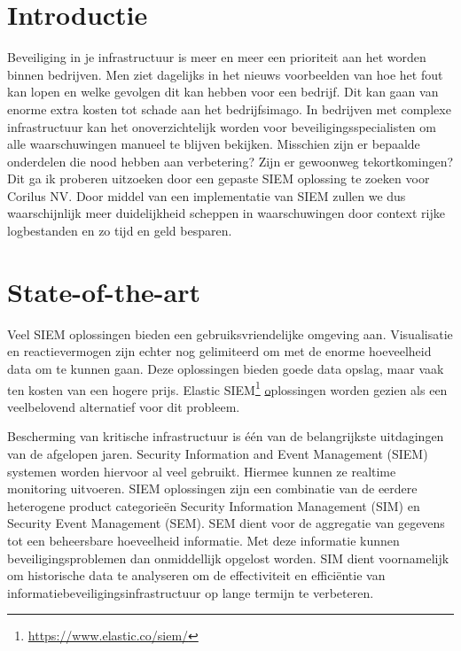 
\section{Introductie} %
\label{sec:introductie}

Beveiliging in je infrastructuur is meer en meer een prioriteit aan het worden binnen bedrijven. Men ziet dagelijks in het nieuws voorbeelden van hoe het fout kan lopen en welke gevolgen dit kan hebben voor een bedrijf. Dit kan gaan van enorme extra kosten tot schade aan het bedrijfsimago. In bedrijven met complexe infrastructuur kan het onoverzichtelijk worden voor beveiligingsspecialisten om alle waarschuwingen manueel te blijven bekijken. Misschien zijn er bepaalde onderdelen die nood hebben aan verbetering? Zijn er gewoonweg tekortkomingen? Dit ga ik proberen uitzoeken door een gepaste SIEM oplossing te zoeken voor Corilus NV. Door middel van een implementatie van SIEM zullen we dus waarschijnlijk meer duidelijkheid scheppen in waarschuwingen door context rijke logbestanden en zo tijd en geld besparen.


\section{State-of-the-art}
\label{sec:state-of-the-art}

Veel SIEM oplossingen bieden een gebruiksvriendelijke omgeving aan. Visualisatie en reactievermogen zijn echter nog gelimiteerd om met de enorme hoeveelheid data om te kunnen gaan. Deze oplossingen bieden goede data opslag, maar vaak ten kosten van een hogere prijs. Elastic SIEM\footnote{\url{https://www.elastic.co/siem/}} \href{https://www.elastic.co/siem/} oplossingen worden gezien als een veelbelovend alternatief voor dit probleem.
\\\autocite{GonzalezGranadillo2021}\medskip

Bescherming van kritische infrastructuur is één van de belangrijkste uitdagingen van de afgelopen jaren. Security Information and Event Management (SIEM) systemen worden hiervoor al veel gebruikt. Hiermee kunnen ze realtime monitoring uitvoeren. SIEM oplossingen zijn een combinatie van de eerdere heterogene product categorieën Security Information Management (SIM) en Security Event Management (SEM). SEM dient voor de aggregatie van gegevens tot een beheersbare hoeveelheid informatie. Met deze informatie kunnen beveiligingsproblemen dan onmiddellijk opgelost worden. SIM dient voornamelijk om historische data te analyseren om de effectiviteit en efficiëntie van informatiebeveiligingsinfrastructuur op lange termijn te verbeteren. \autocite{Garofalo2014}\medskip

